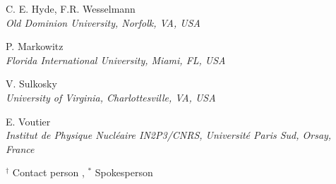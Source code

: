 \documentclass{article}
\begin{document}
\begin{center}
C. E. Hyde, F.R. Wesselmann \\
{\it Old Dominion University, Norfolk, VA, USA}
\vspace*{10pt}

P. Markowitz\\
{\it Florida International University, Miami, FL, USA}
\vspace*{10pt}

V. Sulkosky  \\
{\it University of Virginia, Charlottesville, VA, USA}
\vspace*{20pt}

E. Voutier\\
{\it Institut de Physique Nucl\'eaire IN2P3/CNRS, Universit\'e Paris Sud, 
Orsay, France}
\vspace*{10pt}

\end{center}

$^\dagger$ Contact person , $^\ast$ Spokesperson

\vfill\eject

\clearpage



\newpage

\tableofcontents
\end{document}
